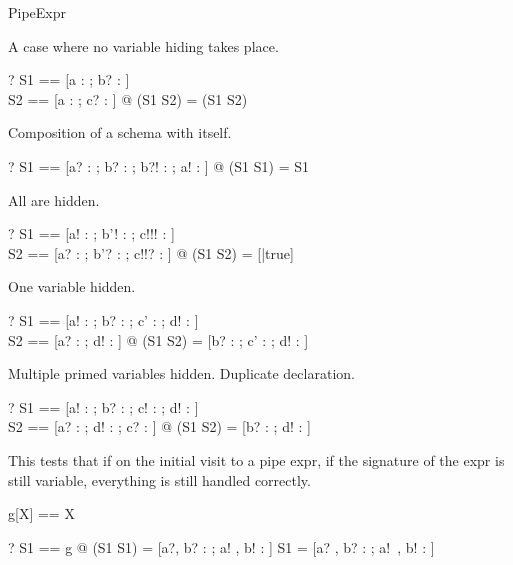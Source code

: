 \begin{zsection}
  \SECTION PipeExpr
\end{zsection}

A case where no variable hiding takes place.
\begin{zed}
  \vdash? \exists S1 == [a : \nat; b? : \nat]\\
                  S2 == [a : \nat; c? : \nat] @
                  (S1 \pipe S2) = (S1 \land S2)
\end{zed}

Composition of a schema with itself.
\begin{zed}
  \vdash? \exists S1 == [a? : \nat; b? : \nat; b?! : \nat; a! : \nat] @
                 (S1 \pipe S1) = S1
\end{zed}

All are hidden.
\begin{zed}
  \vdash? \exists S1 == [a! : \nat; b'! : \nat; c!!! : \nat]\\
                  S2 == [a? : \nat; b'? : \nat; c!!? : \nat] @
      (S1 \pipe S2) = [|true]
\end{zed}

One variable hidden.
\begin{zed}
  \vdash? \exists S1 == [a! : \nat; b? : \nat; c' : \nat; d! : \nat]\\
                  S2 == [a? : \nat; d! : \nat] @
      (S1 \pipe S2) = [b? : \nat; c' : \nat; d! : \nat]
\end{zed}

Multiple primed variables hidden.
Duplicate declaration.
\begin{zed}
  \vdash?
    \exists S1 == [a! : \nat; b? : \nat; c! : \nat; d! : \nat]\\
            S2 == [a? : \nat; d! : \nat; c? : \nat] @
      (S1 \pipe S2) = [b? : \nat; d! : \nat]
\end{zed}

This tests that if on the initial visit to a pipe expr, if the
signature of the expr is still variable, everything is still handled
correctly.

\begin{zed}
  g[X] == X
\end{zed}

\begin{zed}
  \vdash? \exists S1 == g @
             (S1 \semi S1) = [a?, b? : \nat; a! , b! : \nat] \land
             S1 = [a? , b? : \nat; a!~, b! : \nat]\\
\end{zed}
